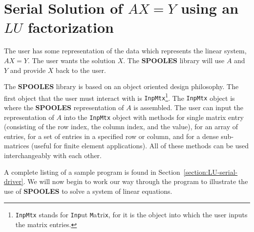 \vfill \eject
\par
\section{Serial Solution of $A X = Y$ using an $LU$ factorization}
\label{section:LU-serial}
\par
The user has some representation of the data which represents the 
linear system, $AX = Y$.  The user wants the solution $X$.  
The {\bf SPOOLES} library will use $A$ and $Y$ 
and provide $X$ back to the user.  
\par
The {\bf SPOOLES} library is based on an object
oriented design philosophy.  The first object that the user
must interact with is {\tt InpMtx}\footnote{
{\tt InpMtx} stands for {\tt Inp}ut {\tt M}a{\tt t}ri{\tt x},
for it is the object into which the user inputs the matrix
entries.}.  
The {\tt InpMtx} object is where 
the {\bf SPOOLES} representation of $A$ is assembled.  
The user can input the representation of $A$ 
into the {\tt InpMtx} object with methods for
single matrix entry (consisting of the row index, the column index,
and the value), for an array of entries, for a set of
entries in a specified row or column, and for a dense sub-matrices
(useful 
for finite element applications).  All of these methods can be used
interchangeably with each other.
\par
A complete listing of a sample program 
is found in Section~\ref{section:LU-serial-driver}.
We will now begin to
work our way through the program to illustrate the use of {\bf
SPOOLES}
to solve a system of linear equations.  
\par
